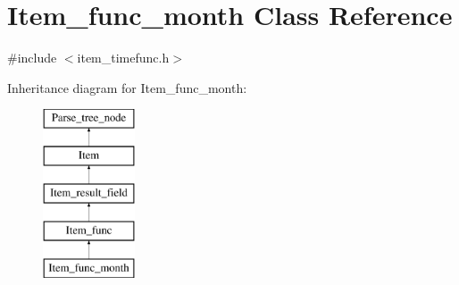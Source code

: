 \hypertarget{classItem__func__month}{}\section{Item\+\_\+func\+\_\+month Class Reference}
\label{classItem__func__month}


{\ttfamily \#include $<$item\+\_\+timefunc.\+h$>$}

Inheritance diagram for Item\+\_\+func\+\_\+month\+:\begin{figure}[H]
\begin{center}
\leavevmode
\includegraphics[height=5.000000cm]{classItem__func__month}
\end{center}
\end{figure}
